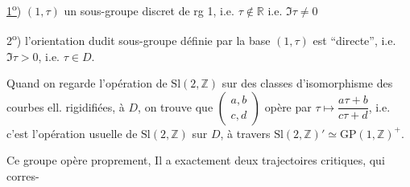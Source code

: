 \uline{1\textsuperscript{o}}) $(1,\tau)$  un sous-groupe discret de rg 1, i.e. $\tau\notin\mathbb R$ i.e. $\Im\tau\ne0$

2\textsuperscript{o}) l'orientation dudit sous-groupe définie par la base $(1,\tau)$ est ``directe'', i.e. $\Im\tau>0$, i.e. $\tau\in D$.

Quand on regarde l'opération de $\mathrm{Sl}(2,\mathbb Z)$ sur  des classes d'isomorphisme des courbes ell. rigidifiées,   à $D$, on trouve que $\begin{pmatrix}a,b\\c,d\end{pmatrix}$ opère par $\tau\longmapsto\dfrac{a\tau+b}{c\tau+d}$, i.e. c'est l'opération usuelle de $\mathrm{Sl}(2,\mathbb Z)$ sur $D$, à travers $\mathrm{Sl}(2,\mathbb Z)'\simeq\mathrm{GP}(1,\mathbb Z)^+$.

Ce groupe opère proprement, Il a exactement deux trajectoires critiques, qui corres-
